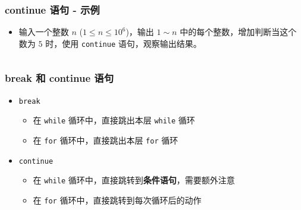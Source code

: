 \begin{frame}[fragile]
    \frametitle{continue 语句 - 示例}

    \begin{itemize}
        \item 输入一个整数 $n$ ($1 \le n \le 10^6$)，输出 $1 \sim n$ 中的每个整数，增加判断当这个数为 $5$ 时，使用 \lstinline|continue| 语句，观察输出结果。
    \end{itemize}

    \begin{columns}


    \end{columns}


\end{frame}

\begin{frame}[fragile]
    \frametitle{break 和 continue 语句}

    \begin{itemize}
        \item \lstinline|break|
            \begin{itemize}
                \item 在 \lstinline|while| 循环中，直接跳出本层 \lstinline|while| 循环
                \item 在 \lstinline|for| 循环中，直接跳出本层 \lstinline|for| 循环
            \end{itemize}
        \item \lstinline|continue|
            \begin{itemize}
                \item 在 \lstinline|while| 循环中，直接跳转到\textbf{条件语句}，需要额外注意
                \item 在 \lstinline|for| 循环中，直接跳转到每次循环后的动作
            \end{itemize}
    \end{itemize}

\end{frame}

